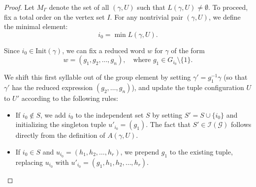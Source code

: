 \documentclass[10pt,a4paper]{amsart}
\begin{document}
\begin{proof}
Let $M_\Gamma$ denote the set of all $(\gamma,U)$ such that $L(\gamma,U)\neq \emptyset$.
To proceed, fix a total order on the vertex set $I$. For any nontrivial pair $(\gamma, U)$, we define the minimal element:
\begin{equation*}
i_0 = \min L(\gamma, U).
\end{equation*}

\item[Case 1: $i_0 \in A(\gamma,U)$.] 
    Since $i_0 \in \mathrm{Init}(\gamma)$, we can fix a reduced word $w$ for $\gamma$ of the form
    \begin{equation*}
        w = (g_1, g_2, \dots, g_n), \quad \text{where } g_1 \in G_{i_0} \setminus \{1\}.
    \end{equation*}
    

    We shift this first syllable out of the group element by setting $\gamma' = g_1^{-1}\gamma$ (so that $\gamma'$ has the reduced expression $(g_2, \dots, g_n)$), and update the tuple configuration $U$ to $U'$ according to the following rules:
    \begin{itemize}
        \item If $i_0 \notin S$, we add $i_0$ to the  independent set $S$ by setting $S' = S \cup \{i_0\}$ and initializing the singleton tuple $u'_{i_0} = (g_1)$. The fact that $S' \in  \mathcal I(\mathcal G)$ follows directly from the definition of $A(\gamma,U)$.
        \item If $i_0 \in S$ and $u_{i_0} = (h_1, h_2, \dots, h_r)$, we prepend $g_1$ to the existing tuple, replacing $u_{i_0}$ with $u'_{i_0} = (g_1, h_1, h_2, \dots, h_r)$.
    \end{itemize}


\end{proof}
\end{document}
